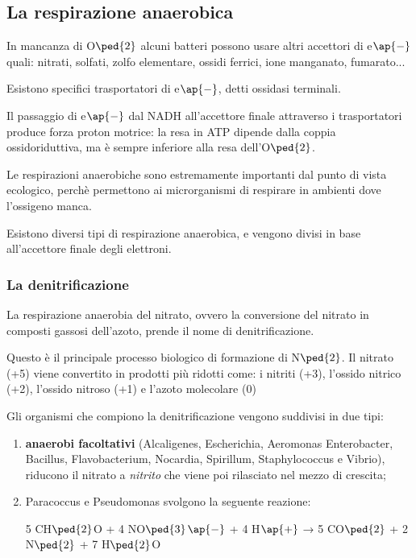 \documentclass[11pt]{book}
\begin{document}
\subsection{La respirazione anaerobica}
In mancanza di O$\ped{2}$ alcuni batteri possono usare altri accettori di e$\ap{-}$ quali: nitrati, solfati, zolfo elementare, ossidi ferrici, ione manganato, fumarato... 

Esistono specifici trasportatori di e$\ap{-}$, detti ossidasi terminali. 

Il passaggio di e$\ap{-}$ dal NADH all’accettore finale attraverso i trasportatori produce forza proton motrice: la resa in ATP dipende dalla coppia ossidoriduttiva, ma è sempre inferiore alla resa dell'O$\ped{2}$.

Le respirazioni anaerobiche sono estremamente importanti dal punto di vista ecologico, perchè permettono ai microrganismi di respirare in ambienti dove l’ossigeno manca.

Esistono diversi tipi di respirazione anaerobica, e vengono divisi in base all'accettore finale degli elettroni.

\subsubsection{La denitrificazione}
La respirazione anaerobia del nitrato, ovvero la conversione del nitrato in composti gassosi dell’azoto, prende il nome di denitrificazione.

Questo è il principale processo biologico di formazione di N$\ped{2}$. 
Il nitrato (+5) viene convertito in prodotti più ridotti come: i nitriti (+3), l’ossido nitrico (+2), l'ossido nitroso (+1) e l'azoto molecolare (0) 

Gli organismi che compiono la denitrificazione vengono suddivisi in due tipi:
\begin{enumerate}
\item \textbf{anaerobi facoltativi} (Alcaligenes, Escherichia, Aeromonas Enterobacter, Bacillus, Flavobacterium, Nocardia, Spirillum, Staphylococcus e Vibrio), riducono il nitrato a \emph{nitrito} che viene poi rilasciato nel mezzo di crescita;
\item Paracoccus e Pseudomonas svolgono la seguente reazione: 

5 CH$\ped{2}$O + 4 NO$\ped{3}$$\ap{-}$ + 4 H$\ap{+}$ → 5 CO$\ped{2}$ + 2 N$\ped{2}$ + 7 H$\ped{2}$O 
\end{enumerate}
\end{document}
